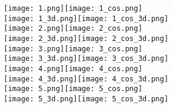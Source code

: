 \documentclass{article}
\begin{document}
\begin{center}
\texttt{[image: 1.png]}\quad\texttt{[image: 1\_cos.png]}
\\
\texttt{[image: 1\_3d.png]}\quad\texttt{[image: 1\_cos\_3d.png]}
\\
\texttt{[image: 2.png]}\quad\texttt{[image: 2\_cos.png]}
\\
\texttt{[image: 2\_3d.png]}\quad\texttt{[image: 2\_cos\_3d.png]}
\\
\texttt{[image: 3.png]}\quad\texttt{[image: 3\_cos.png]}
\\
\texttt{[image: 3\_3d.png]}\quad\texttt{[image: 3\_cos\_3d.png]}
\\
\texttt{[image: 4.png]}\quad\texttt{[image: 4\_cos.png]}
\\
\texttt{[image: 4\_3d.png]}\quad\texttt{[image: 4\_cos\_3d.png]}
\\
\texttt{[image: 5.png]}\quad\texttt{[image: 5\_cos.png]}
\\
\texttt{[image: 5\_3d.png]}\quad\texttt{[image: 5\_cos\_3d.png]}
\end{center}
\end{document}
